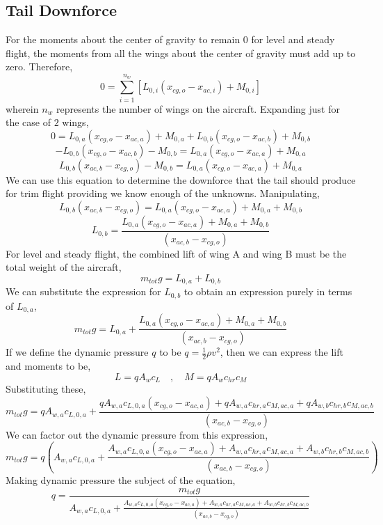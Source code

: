 \subsection{Tail Downforce}
\begin{comment}
\end{comment}
For the moments about the center of gravity to remain $0$ for level and steady flight, the moments from all the wings about the center of gravity must add up to zero. Therefore,
$$0 = \sum^{n_{w}}_{i = 1}\left[L_{0,i}(x_{cg,o}-x_{ac,i}) + M_{0,i}\right]$$
wherein $n_{w}$ represents the number of wings on the aircraft. Expanding just for the case of $2$ wings,
$$0 = L_{0,a}(x_{cg,o}-x_{ac,a}) + M_{0,a} + L_{0,b}(x_{cg,o}-x_{ac,b}) + M_{0,b}$$
$$ - L_{0,b}(x_{cg,o}-x_{ac,b}) - M_{0,b} = L_{0,a}(x_{cg,o}-x_{ac,a}) + M_{0,a}$$
$$L_{0,b}(x_{ac,b}-x_{cg,o}) - M_{0,b} = L_{0,a}(x_{cg,o}-x_{ac,a}) + M_{0,a}$$
We can use this equation to determine the downforce that the tail should produce for trim flight providing we know enough of the unknowns. Manipulating,
$$L_{0,b}(x_{ac,b}-x_{cg,o}) = L_{0,a}(x_{cg,o}-x_{ac,a}) + M_{0,a} + M_{0,b}$$
\begin{equation} L_{0,b} = \frac{L_{0,a}(x_{cg,o}-x_{ac,a}) + M_{0,a} + M_{0,b}}{(x_{ac,b}-x_{cg,o})} \label{tail downforce}\end{equation}
For level and steady flight, the combined lift of wing A and wing B must be the total weight of the aircraft,
$$m_{tot}g = L_{0,a} + L_{0,b}$$
We can substitute the expression for $L_{0,b}$ to obtain an expression purely in terms of $L_{0,a}$,
$$m_{tot}g = L_{0,a} + \frac{L_{0,a}(x_{cg,o}-x_{ac,a}) + M_{0,a} + M_{0,b}}{(x_{ac,b}-x_{cg,o})}$$
If we define the dynamic pressure $q$ to be $\displaystyle q = \frac{1}{2}\rho v^{2}$, then we can express the lift and moments to be,
\begin{equation}L = qA_{w}c_{L} \quad,\quad M = qA_{w}c_{hr}c_{M} \label{basic lift and pitch definitions}\end{equation}
Substituting these,
$$m_{tot}g = qA_{w,a}c_{L,0,a} + \frac{qA_{w,a}c_{L,0,a}(x_{cg,o}-x_{ac,a}) + qA_{w,a}c_{hr,a}c_{M,ac,a} + qA_{w,b}c_{hr,b}c_{M,ac,b}}{(x_{ac,b}-x_{cg,o})}$$
We can factor out the dynamic pressure from this expression,
$$m_{tot}g = q\left(A_{w,a}c_{L,0,a} + \frac{A_{w,a}c_{L,0,a}(x_{cg,o}-x_{ac,a}) + A_{w,a}c_{hr,a}c_{M,ac,a} + A_{w,b}c_{hr,b}c_{M,ac,b}}{(x_{ac,b}-x_{cg,o})}\right)$$
Making dynamic pressure the subject of the equation,
\begin{equation}
q = \frac{m_{tot}g}{\displaystyle  A_{w,a}c_{L,0,a} + \frac{A_{w,a}c_{L,0,a}(x_{cg,o}-x_{ac,a}) + A_{w,a}c_{hr,a}c_{M,ac,a} + A_{w,b}c_{hr,b}c_{M,ac,b}}{(x_{ac,b}-x_{cg,o})} } 
\label{dynamic pressure at trim}\end{equation}
